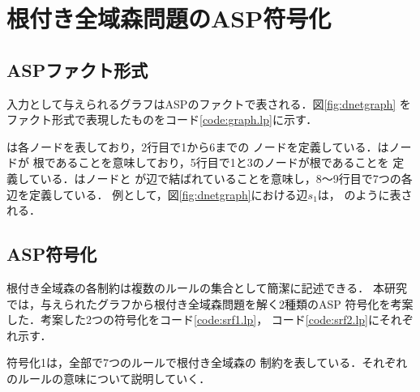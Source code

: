 \section{根付き全域森問題のASP符号化}

\subsection{ASPファクト形式}
入力として与えられるグラフはASPのファクトで表される．図\ref{fig:dnetgraph}
をファクト形式で表現したものをコード\ref{code:graph.lp}に示す．



は各ノードを表しており，2行目で1から6までの
ノードを定義している．はノードが
根であることを意味しており，5行目で1と3のノードが根であることを
定義している．はノードと
が辺で結ばれていることを意味し，8～9行目で7つの各辺を定義している．
例として，図\ref{fig:dnetgraph}における辺$s_{1}$は，
のように表される．

\subsection{ASP符号化}
根付き全域森の各制約は複数のルールの集合として簡潔に記述できる．
本研究では，与えられたグラフから根付き全域森問題を解く2種類のASP
符号化を考案した．考案した2つの符号化をコード\ref{code:srf1.lp}，
コード\ref{code:srf2.lp}にそれぞれ示す．





符号化1は，全部で7つのルールで根付き全域森の
制約を表している．それぞれのルールの意味について説明していく．

